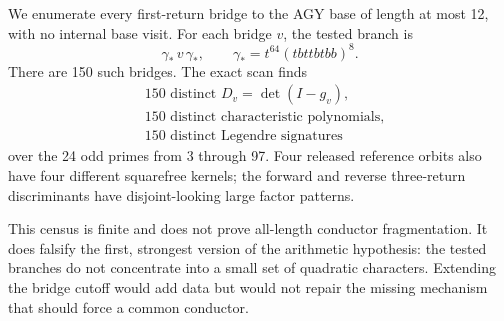 We enumerate every first-return bridge to the AGY base of length at most 12,
with no internal base visit.  For each bridge \(v\), the tested branch is
\[
\gamma_*\,v\,\gamma_*,
\qquad
\gamma_*=t^{64}(tbttbtbb)^8.
\]
There are 150 such bridges.  The exact scan finds
\[
\begin{aligned}
&150\text{ distinct }D_v=\det(I-g_v),\\
&150\text{ distinct characteristic polynomials},\\
&150\text{ distinct Legendre signatures}
\end{aligned}
\]
over the 24 odd primes from 3 through 97.  Four released reference orbits
also have four different squarefree kernels; the forward and reverse
three-return discriminants have disjoint-looking large factor patterns.

This census is finite and does not prove all-length conductor fragmentation.
It does falsify the first, strongest version of the arithmetic hypothesis:
the tested branches do not concentrate into a small set of quadratic
characters.  Extending the bridge cutoff would add data but would not repair
the missing mechanism that should force a common conductor.
